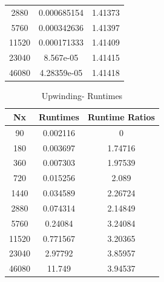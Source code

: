 \documentclass[12pt]{article}
\begin{document}
\begin{enumerate}[(a)]
\begin{minipage}{0.5\textwidth}
\begin{table}[H]
\begin{tabular}{||c|cc||}
  2880 &      0.000685154 &  1.41373 \\
  5760 &      0.000342636 &  1.41397 \\
 11520 &      0.000171333 &  1.41409 \\
 23040 &      8.567e-05   &  1.41415 \\
 46080 &      4.28359e-05 &  1.41418 \\
\hline \hline
\end{tabular}
\end{table}
\end{minipage}%
\begin{minipage}{0.5\textwidth}
\begin{table}[H]
\caption{Upwinding- Runtimes}
\centering\begin{tabular}{||c|cc||}
\hline \hline
    Nx &   Runtimes &   Runtime Ratios \\
\hline
    90 &   0.002116 &          0       \\
   180 &   0.003697 &          1.74716 \\
   360 &   0.007303 &          1.97539 \\
   720 &   0.015256 &          2.089   \\
  1440 &   0.034589 &          2.26724 \\
  2880 &   0.074314 &          2.14849 \\
  5760 &   0.24084  &          3.24084 \\
 11520 &   0.771567 &          3.20365 \\
 23040 &   2.97792  &          3.85957 \\
 46080 &  11.749    &          3.94537 \\
\hline
\end{tabular}
\end{table}
\end{minipage}

\end{enumerate}
\end{document}
